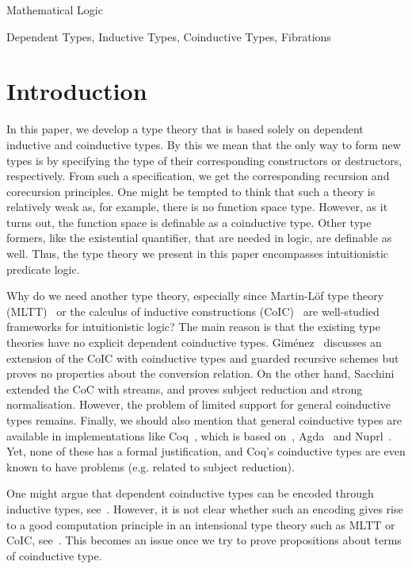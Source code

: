 \documentclass[preprint]{sigplanconf}
\begin{document}
                {Mathematical Logic}




\keywords
Dependent Types, Inductive Types, Coinductive Types, Fibrations


\section{Introduction}
\label{sec:intro}


In this paper, we develop a type theory that is based solely on dependent
inductive and coinductive types.
By this we mean that the only way to form new types is by specifying the type
of their corresponding constructors or destructors, respectively.
From such a specification, we get the corresponding recursion and corecursion
principles.
One might be tempted to think that such a theory is relatively weak as, for
example, there is no function space type.
However, as it turns out, the function space is definable as a
coinductive type.
Other type formers, like the existential quantifier, that are needed in logic,
are definable as well.
Thus, the type theory we present in this paper encompasses intuitionistic
predicate logic.

Why do we need another type theory, especially since
Martin-Löf type theory (MLTT)~\cite{MartinLof-ModelsITT} or the calculus of
inductive constructions (CoIC)~\cite{Paulin-Mohring93,Werner1994,BertotC04}
are well-studied
frameworks for intuitionistic logic?
The main reason is that the existing type theories have no explicit
dependent coinductive types.
Gim\'enez~\cite{Gimenez-RecursiveSchemes} discusses an extension of the CoIC
with coinductive types and guarded recursive schemes but proves no properties
about the conversion relation.
On the other hand, Sacchini~\cite{Sacchini-TypeBasedProductivity} extended the
CoC with streams, and proves subject reduction and strong normalisation.
However, the problem of limited support for general coinductive types remains.
Finally, we should also mention that general coinductive types are
available in implementations like Coq~\cite{Coq:manual}, which is based
on~\cite{Gimenez-RecursiveSchemes}, Agda~\cite{Agda:system} and
Nuprl~\cite{Constable:NuprlTT}.
Yet, none of these has a formal justification, and Coq's coinductive types
are even known to have problems (e.g. related to subject reduction).

One might argue that dependent coinductive types can be encoded through
inductive types, see~\cite{Ahrens:MTypes-HoTT,Basold-DepCoindFibDialg}.
However, it is not clear whether such an encoding gives rise to a good
computation principle in an intensional type theory such as MLTT or CoIC,
see~\cite{cLab:FinalChain-TT}.
This becomes an issue once we try to prove propositions about terms of
coinductive type.
\end{document}
